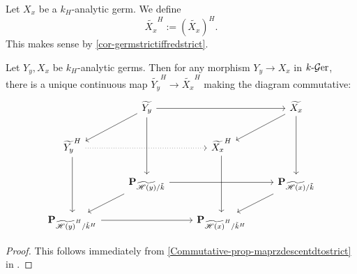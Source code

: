\begin{definition}
    Let $X_x$ be a $k_H$-analytic germ. We define 
    \[
        \widetilde{X_x}^H:=  \left(\widetilde{X_x}\right)^H.
    \]
    This makes sense by \cref{cor-germstrictiffredstrict}.
\end{definition}

\begin{proposition}\label{prop-morphismgermHstrictredcube}
    Let $Y_y, X_x$ be $k_H$-analytic germs. Then for any morphism $Y_y\rightarrow X_x$ in $k\text{-}\mathcal{G}\mathrm{er}$, there is a unique continuous map $\widetilde{Y_y}^H\rightarrow \widetilde{X_x}^H$ making the diagram commutative:
    \[
        \begin{tikzcd}
            & \widetilde{Y_y} \arrow[rr] \arrow[dd] \arrow[ld]                        &                                                       & \widetilde{X_x} \arrow[dd] \arrow[ld]                        \\
\widetilde{Y_y}^H \arrow[rr, dotted] \arrow[dd]                  &                                                                         & \widetilde{X_x}^H \arrow[dd]                          &                                                              \\
            & \mathbf{P}_{\widetilde{\mathscr{H}(y)}/\tilde{k}} \arrow[rr] \arrow[ld] &                                                       & \mathbf{P}_{\widetilde{\mathscr{H}(x)}/\tilde{k}} \arrow[ld] \\
\mathbf{P}_{\widetilde{\mathscr{H}(y)}^H/\tilde{k}^H} \arrow[rr] &                                                                         & \mathbf{P}_{\widetilde{\mathscr{H}(x)}^H/\tilde{k}^H} &                                                             
\end{tikzcd}  
    \]
\end{proposition}
\begin{proof}
    This follows immediately from \cref{Commutative-prop-maprzdescentdtostrict} in .
\end{proof}


